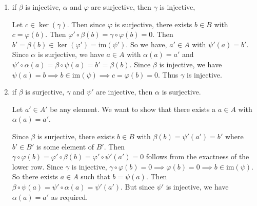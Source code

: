\documentclass[12pt]{article}
\newcommand{\al}{\alpha}
\newcommand{\im}{\text{im}}
\begin{document}
\begin{enumerate}
\begin{enumerate}
    \item if $\beta$ is injective, $\al$ and $\varphi$ are
    surjective, then $\gamma$ is injective,

    \begin{mybox}
        Let $c\in\ker(\gamma)$. Then since $\varphi$ is
        surjective, there exists $b\in B$ with
        $c=\varphi(b)$. Then $\varphi'\circ\beta(b)
        =\gamma\circ\varphi(b)=0$. Then $b'=\beta(b)
        \in\ker(\varphi')=\im(\psi')$. So we have,
        $a'\in A$ with $\psi'(a)=b'$. Since $\alpha$ is
        surjective, we have $a\in A$ with $\alpha(a)=a'$
        and $\psi'\circ\alpha(a)=\beta\circ\psi(a)=b'
        =\beta(b)$. Since $\beta$ is injective, we have
        $\psi(a)=b\implies b\in\im(\psi)\implies
        c=\varphi(b)=0$. Thus $\gamma$ is injective.

    \end{mybox}

    \item if $\beta$ is surjective, $\gamma$ and $\psi'$
    are injective, then $\al$ is surjective.
    \begin{mybox}
        Let $a'\in A'$ be any element. We want to show that
        there exists a $a\in A$ with $\alpha(a)=a'$.

        \vspace*{2mm}
        Since $\beta$ is surjective, there exists $b\in B$
        with $\beta(b)=\psi'(a')=b'$ where $b'\in B'$ is
        some element of $B'$. Then $\gamma\circ\varphi(b)=
        \varphi'\circ\beta(b)=\varphi'\circ\psi'(a')=0$
        follows from the exactness of the lower row.
        Since $\gamma$ is injective, $\gamma\circ\varphi
        (b)=0\implies\varphi(b)=0\implies b\in\im(\psi)$.
        So there exists $a\in A$ such that $b=\psi(a)$.
        Then $\beta\circ\psi(a)=\psi'\circ\alpha(a)=
        \psi'(a')$. But since $\psi'$ is injective, we have
        $\alpha(a)=a'$ as required.
    \end{mybox}

\end{enumerate}


\end{enumerate}
\end{document}
